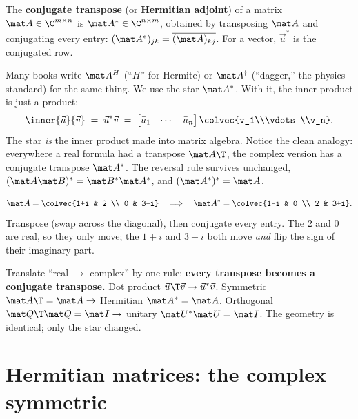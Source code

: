 \begin{definition}\label{ch32:adjoint}
The \textbf{conjugate transpose} (or \textbf{Hermitian adjoint}) of a matrix
$\mat A\in\C^{m\times n}$ is $\mat A^{*}\in\C^{n\times m}$, obtained by transposing
$\mat A$ and conjugating every entry: $(\mat A^{*})_{jk} = \overline{(\mat A)_{kj}}$.
For a vector, $\vec u^{*}$ is the conjugated row.
\end{definition}

Many books write $\mat A^{H}$ (``$H$'' for Hermite) or $\mat A^{\dagger}$ (``dagger,''
the physics standard) for the same thing. We use the star $\mat A^{*}$. With it,
the inner product is just a product:
\[
  \inner{\vec u}{\vec v} \;=\; \vec u^{*}\vec v
  \;=\; \begin{bmatrix}\bar u_1 & \cdots & \bar u_n\end{bmatrix}
        \colvec{v_1\\\vdots\\v_n}.
\]
The star \emph{is} the inner product made into matrix algebra. Notice the clean
analogy: everywhere a real formula had a transpose $\mat A\T$, the complex version
has a conjugate transpose $\mat A^{*}$. The reversal rule survives unchanged,
$(\mat A\mat B)^{*} = \mat B^{*}\mat A^{*}$, and $(\mat A^{*})^{*} = \mat A$.

\begin{example}\label{ch32:starex}
\[
  \mat A = \colvec{1+i & 2 \\ 0 & 3-i}
  \quad\Longrightarrow\quad
  \mat A^{*} = \colvec{1-i & 0 \\ 2 & 3+i}.
\]
Transpose (swap across the diagonal), then conjugate every entry. The $2$ and $0$
are real, so they only move; the $1+i$ and $3-i$ both move \emph{and} flip the sign
of their imaginary part.
\end{example}

\begin{focusbox}
Translate ``real $\to$ complex'' by one rule: \textbf{every transpose becomes a
conjugate transpose.} Dot product $\vec u\T\vec v\to\vec u^{*}\vec v$. Symmetric
$\mat A\T=\mat A\to$ Hermitian $\mat A^{*}=\mat A$. Orthogonal
$\mat Q\T\mat Q=\mat I\to$ unitary $\mat U^{*}\mat U=\mat I$. The geometry is
identical; only the star changed.
\end{focusbox}

\section{Hermitian matrices: the complex symmetric}

